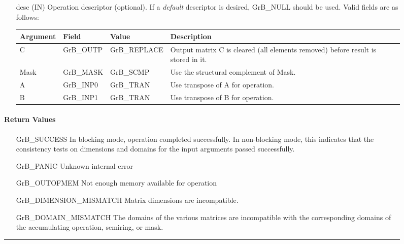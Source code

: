 \begin{figure*}[h]
\begin{itemize}[leftmargin=1.1in]
    \item[{\sf desc}] ({\sf IN}) Operation descriptor (optional). If
    a \emph{default} descriptor is desired, {\sf GrB\_NULL} should be
    used. Valid fields are as follows: 

    \begin{tabular}{lllp{2.75in}}
    Argument   & Field           & Value               & Description \\ \hline
    {\sf C}    & {\sf GrB\_OUTP} & {\sf GrB\_REPLACE}  & Output matrix {\sf C} is cleared (all elements removed) before result is stored in it. \\
    {\sf Mask} & {\sf GrB\_MASK} & {\sf GrB\_SCMP}     & Use the structural complement of {\sf Mask}. \\
    {\sf A}    & {\sf GrB\_INP0} & {\sf GrB\_TRAN}     & Use transpose of {\sf A} for operation. \\
    {\sf B}    & {\sf GrB\_INP1} & {\sf GrB\_TRAN}     & Use transpose of {\sf B} for operation. \\
    \end{tabular}
\end{itemize}

\paragraph{Return Values}

\begin{itemize}[leftmargin=2.1in]

	\item[{\sf GrB\_SUCCESS}]	      In blocking mode, operation
	completed successfully. In non-blocking mode, this indicates
	that the consistency tests on dimensions and domains for the
	input arguments passed successfully.  

	\item[{\sf GrB\_PANIC}]		      Unknown internal error

	\item[{\sf GrB\_OUTOFMEM}]	      Not enough memory available
	for operation

	\item[{\sf GrB\_DIMENSION\_MISMATCH}] Matrix dimensions are
	incompatible.

	\item[{\sf GrB\_DOMAIN\_MISMATCH}]    The domains of the various
	matrices are incompatible with the corresponding domains of the
	accumulating operation, semiring, or mask.

\end{itemize}

\hrule
\end{figure*}

